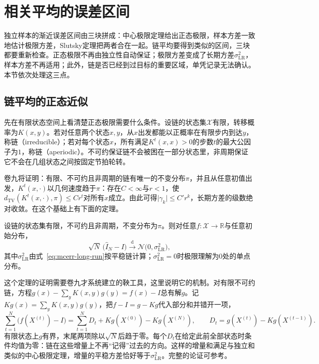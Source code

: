 \section{相关平均的误差区间}
\label{sec:mcerr-chain-interval}

独立样本的渐近误差区间由三块拼成：中心极限定理给出正态极限，样本方差一致地估计极限方差，Slutsky定理把两者合在一起。链平均要得到类似的区间，三块都要重新检查。正态极限不再由独立性自动保证；极限方差变成了长期方差$\sigma_{\mathrm{LR}}^{2}$，样本方差不再适用；此外，链是否已经到过目标的重要区域，单凭记录无法确认。本节依次处理这三点。

\subsection{链平均的正态近似}
\label{sec:mcerr-chain-clt}

先在有限状态空间上看清楚正态极限需要什么条件。设链的状态集$\mathcal{X}$有限，转移概率为$K(x,y)$。若对任意两个状态$x,y$，从$x$出发都能以正概率在有限步内到达$y$，称链（irreducible）；若对每个状态$x$，所有满足$K^{t}(x,x)>0$的步数$t$的最大公因子为$1$，称链（aperiodic）。不可约保证链不会被困在一部分状态里，非周期保证它不会在几组状态之间按固定节拍轮转。

卷九将证明：有限、不可约且非周期的链有唯一的不变分布$\pi$，并且从任意初值出发，$K^{t}(x,\cdot)$以几何速度趋于$\pi$：存在$C<\infty$与$r<1$，使$d_{\mathrm{TV}}(K^{t}(x,\cdot),\pi)\leq Cr^{t}$对所有$x$成立。由此可得$\lvert\gamma_k\rvert\leq C'r^{k}$，长期方差的级数绝对收敛。在这个基础上有下面的定理。

\begin{theorem}[有限状态链的中心极限定理]
\label{thm:mcerr-finite-clt}
设链的状态集有限，不可约且非周期，不变分布为$\pi$。则对任意$f\colon\mathcal{X}\to\mathbb{R}$与任意初始分布，
\begin{equation}
 \sqrt{N}\,\bigl(\hat{I}_N-I\bigr)\xrightarrow{\mathrm{d}}\mathcal{N}\bigl(0,\sigma_{\mathrm{LR}}^{2}\bigr) ,
 \label{eq:mcerr-finite-clt}
\end{equation}
其中$\sigma_{\mathrm{LR}}^{2}$由式~\eqref{eq:mcerr-long-run}按平稳链计算；$\sigma_{\mathrm{LR}}^{2}=0$时极限理解为$0$处的单点分布。
\end{theorem}

这个定理的证明需要卷九才系统建立的鞅工具，这里说明它的机制。对有限不可约链，方程$g(x)-\sum_yK(x,y)g(y)=f(x)-I$总有解$g$。记$Kg(x)=\sum_yK(x,y)g(y)$，把$f-I=g-Kg$代入部分和并错开一项，
\[
 \sum_{t=1}^{N}\bigl(f(X^{(t)})-I\bigr)=\sum_{t=1}^{N}D_t+Kg(X^{(0)})-Kg(X^{(N)}),\qquad D_t=g(X^{(t)})-Kg(X^{(t-1)}) .
\]
有限状态上$g$有界，末尾两项除以$\sqrt{N}$后趋于零。每个$D_t$在给定此前全部状态时条件均值为零：链在这些增量上不再“记得”过去的方向。这样的增量和满足与独立和类似的中心极限定理，增量的平稳方差恰好等于$\sigma_{\mathrm{LR}}^{2}$。完整的论证可参考。

